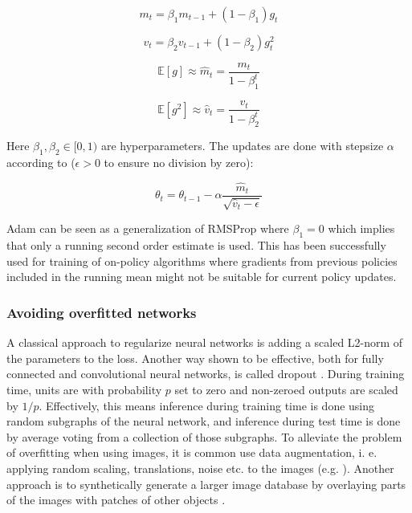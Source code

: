 \begin{equation}
    m_t = \beta_1 m_{t-1} + (1 - \beta_1) g_t
\end{equation}

\begin{equation}
    v_t = \beta_2 v_{t-1} + (1 - \beta_2) g_t^2
\end{equation}

\begin{equation}
    \mathbb{E}\left[g \right] \approx \hat{m}_t = \frac{m_t}{1- \beta_1^t}
\end{equation}

\begin{equation}
    \mathbb{E}\left[g^2 \right] \approx \hat{v}_t = \frac{v_t}{1- \beta_2^t}
\end{equation}

Here $\beta_1, \beta_2 \in [0, 1)$ are hyperparameters. The updates are done
with stepsize $\alpha$ according to ($\epsilon >0$ to ensure no division by zero):

\begin{equation}
    \theta_t = \theta_{t-1} - \alpha \frac{\hat{m}_t}{\sqrt{\hat{v}_t - \epsilon}}
\end{equation}

Adam can be seen as a generalization of RMSProp where $\beta_1 = 0$
\cite{tieleman2012lecture} which implies that only a running second order
estimate is used. This has been successfully used for training of on-policy
algorithms \cite{mnih2016asynchronous} where gradients from previous policies
included in the running mean might not be suitable for current policy updates.

\subsubsection{Avoiding overfitted networks}

A classical approach to regularize neural networks is adding a scaled L2-norm
of the parameters to the loss. Another way shown to be effective, both for fully
connected and convolutional neural networks, is called dropout
\cite{srivastava2014dropout}. During training time, units are with probability
$p$ set to zero and non-zeroed outputs are scaled by $1/p$. Effectively, this
means inference during training time is done using random subgraphs of the
neural network, and inference during test time is done by average voting from a
collection of those subgraphs. To alleviate the problem of overfitting when
using images, it is common use data augmentation, i. e. applying random
scaling, translations, noise etc. to the images (e.g.
\cite{ciregan2012multi,simard2003best,krizhevsky2012imagenet}).  Another
approach is to synthetically generate a larger image database by overlaying
parts of the images with patches of other objects \cite{ghadirzadeh2017deep}.

